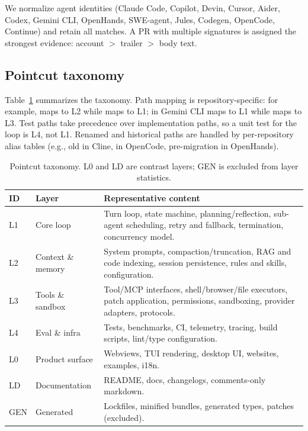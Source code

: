 \documentclass[sigconf,review]{acmart}
\begin{document}
We normalize agent identities (Claude Code, Copilot, Devin, Cursor, Aider, Codex, Gemini CLI, OpenHands, SWE-agent, Jules, Codegen, OpenCode, Continue) and retain all matches. A PR with multiple signatures is assigned the strongest evidence: account $>$ trailer $>$ body text.

\subsection{Pointcut taxonomy}

Table~\ref{tab:layers} summarizes the taxonomy. Path mapping is repository-specific: for example,  maps to L2 while  maps to L1;  in Gemini CLI maps to L1 while  maps to L3. Test paths take precedence over implementation paths, so a unit test for the loop is L4, not L1. Renamed and historical paths are handled by per-repository alias tables (e.g., old  in Cline,  in OpenCode, pre-migration  in OpenHands).

\begin{table}[t]
\centering
\small
\caption{Pointcut taxonomy. L0 and LD are contrast layers; GEN is excluded from layer statistics.}
\label{tab:layers}
\begin{tabular}{@{}>{\raggedright\arraybackslash}p{}>{\raggedright\arraybackslash}p{}>{\raggedright\arraybackslash}p{}@{}}
\toprule
ID & Layer & Representative content \\
\midrule
L1 & Core loop & Turn loop, state machine, planning/reflection, sub-agent scheduling, retry and fallback, termination, concurrency model. \\
L2 & Context \& memory & System prompts, compaction/truncation, RAG and code indexing, session persistence, rules and skills, configuration. \\
L3 & Tools \& sandbox & Tool/MCP interfaces, shell/browser/file executors, patch application, permissions, sandboxing, provider adapters, protocols. \\
L4 & Eval \& infra & Tests, benchmarks, CI, telemetry, tracing, build scripts, lint/type configuration. \\
L0 & Product surface & Webviews, TUI rendering, desktop UI, websites, examples, i18n. \\
LD & Documentation & README, docs, changelogs, comments-only markdown. \\
GEN & Generated & Lockfiles, minified bundles, generated types, patches (excluded). \\
\bottomrule
\end{tabular}
\end{table}
\end{document}
